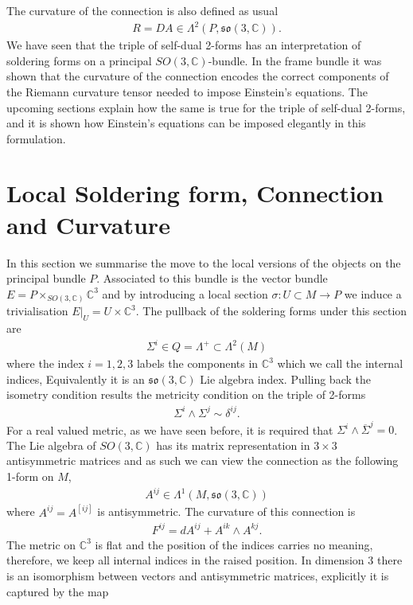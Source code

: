 \documentclass[10pt]{report}
\theoremstyle{definition}
\newcommand{\C}[0]{\mathbb{C}}
\newcommand{\E}[0]{\C^3}
\begin{document}
The curvature of the connection is also defined as usual
\begin{align}
    R = DA \in \Lambda^2(P,\mathfrak{so}(3,\C)).
\end{align}
We have seen that the triple of self-dual 2-forms has an interpretation of soldering forms on a principal $SO(3,\C)$-bundle. In the frame bundle it was shown that the curvature of the connection encodes the correct components of the Riemann curvature tensor needed to impose Einstein's equations. The upcoming sections explain how the same is true for the triple of self-dual 2-forms, and it is shown how Einstein's equations can be imposed elegantly in this formulation.

\section{Local Soldering form, Connection and Curvature}
In this section we summarise the move to the local versions of the objects on the principal bundle $P$. Associated to this bundle is the vector bundle $E = P \times_{SO(3,\C)} \E$ and by introducing a local section $\sigma : U \subset M \rightarrow P$ we induce a trivialisation $E|_U = U \times \E$. The pullback of the soldering forms under this section are
\begin{align}
    \Sigma^i \in Q = \Lambda^+ \subset \Lambda^2(M)
\end{align}
where the index $i = 1,2,3$ labels the components in $\E$ which we call the internal indices, Equivalently it is an $\mathfrak{so}(3,\C)$ Lie algebra index. Pulling back the isometry condition results the metricity condition on the triple of 2-forms
\begin{align}
    \Sigma^i \wedge \Sigma^j \sim \delta^{ij}.
\end{align}
For a real valued metric, as we have seen before, it is required that $\Sigma^i \wedge \overline{\Sigma}^j = 0$. The Lie algebra of $SO(3,\C)$ has its matrix representation in $3 \times 3$ antisymmetric matrices and as such we can view the connection as the following 1-form on $M$,
\begin{align}
    A^{ij} \in \Lambda^1(M,\mathfrak{so}(3,\C))
\end{align}
where $A^{ij} = A^{[ij]}$ is antisymmetric. The curvature of this connection is 
\begin{align}
    F^{ij} = dA^{ij} + A^{ik} \wedge A^{kj}.
\end{align}
The metric on $\E$ is flat and the position of the indices carries no meaning, therefore, we keep all internal indices in the raised position. In dimension 3 there is an isomorphism between vectors and antisymmetric matrices, explicitly it is captured by the map 
\end{document}
